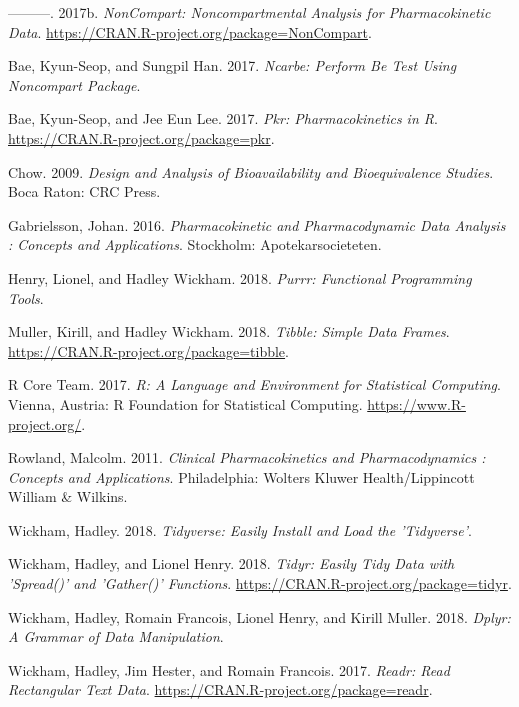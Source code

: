 \documentclass[12pt,]{krantz}
\theoremstyle{definition}
\theoremstyle{definition}
\theoremstyle{definition}
\theoremstyle{remark}
\begin{document}
\hypertarget{ref-R-NonCompart}{}
---------. 2017b. \emph{NonCompart: Noncompartmental Analysis for
Pharmacokinetic Data}.
\url{https://CRAN.R-project.org/package=NonCompart}.

\hypertarget{ref-R-ncarbe}{}
Bae, Kyun-Seop, and Sungpil Han. 2017. \emph{Ncarbe: Perform Be Test
Using Noncompart Package}.

\hypertarget{ref-R-pkr}{}
Bae, Kyun-Seop, and Jee Eun Lee. 2017. \emph{Pkr: Pharmacokinetics in
R}. \url{https://CRAN.R-project.org/package=pkr}.

\hypertarget{ref-chow2009design}{}
Chow. 2009. \emph{Design and Analysis of Bioavailability and
Bioequivalence Studies}. Boca Raton: CRC Press.

\hypertarget{ref-gab}{}
Gabrielsson, Johan. 2016. \emph{Pharmacokinetic and Pharmacodynamic Data
Analysis : Concepts and Applications}. Stockholm: Apotekarsocieteten.

\hypertarget{ref-R-purrr}{}
Henry, Lionel, and Hadley Wickham. 2018. \emph{Purrr: Functional
Programming Tools}.

\hypertarget{ref-R-tibble}{}
Muller, Kirill, and Hadley Wickham. 2018. \emph{Tibble: Simple Data
Frames}. \url{https://CRAN.R-project.org/package=tibble}.

\hypertarget{ref-R-base}{}
R Core Team. 2017. \emph{R: A Language and Environment for Statistical
Computing}. Vienna, Austria: R Foundation for Statistical Computing.
\url{https://www.R-project.org/}.

\hypertarget{ref-tozer}{}
Rowland, Malcolm. 2011. \emph{Clinical Pharmacokinetics and
Pharmacodynamics : Concepts and Applications}. Philadelphia: Wolters
Kluwer Health/Lippincott William \& Wilkins.

\hypertarget{ref-R-tidyverse}{}
Wickham, Hadley. 2018. \emph{Tidyverse: Easily Install and Load the
'Tidyverse'}.

\hypertarget{ref-R-tidyr}{}
Wickham, Hadley, and Lionel Henry. 2018. \emph{Tidyr: Easily Tidy Data
with 'Spread()' and 'Gather()' Functions}.
\url{https://CRAN.R-project.org/package=tidyr}.

\hypertarget{ref-R-dplyr}{}
Wickham, Hadley, Romain Francois, Lionel Henry, and Kirill Muller. 2018.
\emph{Dplyr: A Grammar of Data Manipulation}.

\hypertarget{ref-R-readr}{}
Wickham, Hadley, Jim Hester, and Romain Francois. 2017. \emph{Readr:
Read Rectangular Text Data}.
\url{https://CRAN.R-project.org/package=readr}.
\end{document}
